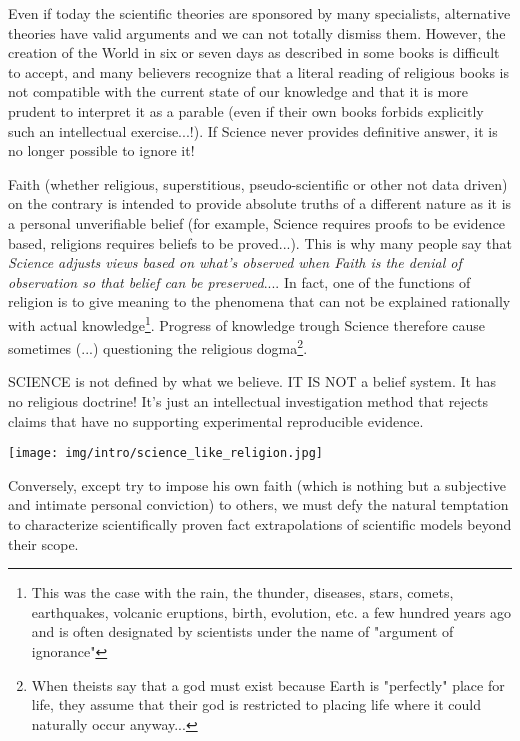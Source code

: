 	Even if today the scientific theories are sponsored by many specialists, alternative theories have valid arguments and we can not totally dismiss them. However, the creation of the World in six or seven days as described in some books is difficult to accept, and many believers recognize that a literal reading of religious books is not compatible with the current state of our knowledge and that it is more prudent to interpret it as a parable (even if their own books forbids explicitly such an intellectual exercise...!). If Science never provides definitive answer, it is no longer possible to ignore it!

	Faith (whether religious, superstitious, pseudo-scientific or other not data driven) on the contrary is intended to provide absolute truths of a different nature as it is a personal unverifiable belief (for example, Science requires proofs to be evidence based, religions requires beliefs to be proved...). This is why many people say that \textit{Science adjusts views based on what's observed when Faith is the denial of observation so that belief can be preserved}.... In fact, one of the functions of religion is to give meaning to the phenomena that can not be explained rationally with actual knowledge\footnote{This was the case with the rain, the thunder, diseases, stars, comets, earthquakes, volcanic eruptions, birth, evolution, etc. a few hundred years ago and is often designated by scientists under the name of "argument of ignorance"}. Progress of knowledge trough Science therefore cause sometimes (...) questioning the religious dogma\footnote{When theists say that a god must exist because Earth is "perfectly" place for life, they assume that their god is restricted to placing life where it could naturally occur anyway...}. 
	
	\begin{fquote}SCIENCE is not defined by what we believe. IT IS NOT a belief system. It has no religious doctrine! It's just an intellectual investigation method that rejects claims that have no supporting experimental reproducible evidence.
 	\end{fquote}
	\begin{center}
		\texttt{[image: img/intro/science\_like\_religion.jpg]}
	\end{center}
	Conversely, except try to impose his own faith (which is nothing but a subjective and intimate personal conviction) to others, we must defy the natural temptation to characterize scientifically proven fact extrapolations of scientific models beyond their scope.

